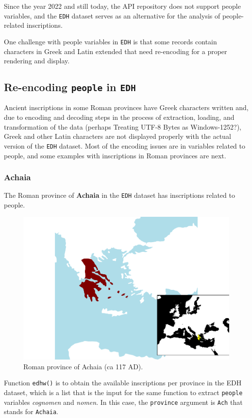 \documentclass[a4paper,11pt]{memoir}
\begin{document}
Since the year 2022 and still today, the API repository does not support
people variables, and the \texttt{EDH} dataset serves as an alternative
for the analysis of people-related inscriptions.

One challenge with people variables in \texttt{EDH} is that some records
contain characters in Greek and Latin extended that need re-encoding for
a proper rendering and display.

\hypertarget{re-encoding-people-in-edh}{%
\subsection{\texorpdfstring{Re-encoding \texttt{people} in
\texttt{EDH}}{Re-encoding people in EDH}}\label{re-encoding-people-in-edh}}

Ancient inscriptions in some Roman provinces have Greek characters
written and, due to encoding and decoding steps in the process of
extraction, loading, and transformation of the data (perhaps Treating
UTF-8 Bytes as Windows-1252?), Greek and other Latin characters are not
displayed properly with the actual version of the \texttt{EDH} dataset.
Most of the encoding issues are in variables related to people, and some
examples with inscriptions in Roman provinces are next.

\hypertarget{achaia}{%
\subsubsection{Achaia}\label{achaia}}

The Roman province of \textbf{Achaia} in the \texttt{EDH} dataset has
inscriptions related to people.


\begin{figure}

{\centering \includegraphics[width=0.25\linewidth]{img/unnamed-chunk-3-1} 

}

\caption{Roman province of Achaia (ca 117 AD).}\label{fig:unnamed-chunk-3}
\end{figure}

Function \texttt{edhw()} is to obtain the available inscriptions per
province in the EDH dataset, which is a list that is the input for the
same function to extract \texttt{people} variables \emph{cognomen} and
\emph{nomen}. In this case, the
\texttt{\textquotesingle{}province\textquotesingle{}} argument is
\texttt{Ach} that stands for \texttt{Achaia}.
\end{document}
